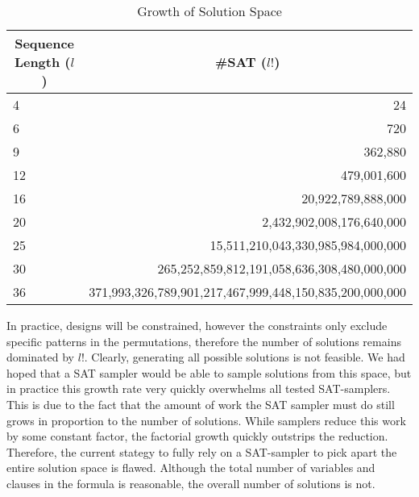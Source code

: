 \begin{table}[t]
  \centering
  \caption{Growth of Solution Space}
\begin{tabular}{|l|r|}
\hline
\multicolumn{1}{|c|}{\textbf{Sequence Length ($l$)}} & \multicolumn{1}{c|}{\textbf{\#SAT ($l!$)}}              \\ \hline
4                                                    & 24                                                      \\ \hline
6                                                    & 720                                                     \\ \hline
9                                                    & 362,880                                                 \\ \hline
12                                                   & 479,001,600                                             \\ \hline
16                                                   & 20,922,789,888,000                                      \\ \hline
20                                                   & 2,432,902,008,176,640,000                               \\ \hline
25                                                   & 15,511,210,043,330,985,984,000,000                      \\ \hline
30                                                   & 265,252,859,812,191,058,636,308,480,000,000             \\ \hline
36                                                   & 371,993,326,789,901,217,467,999,448,150,835,200,000,000 \\ \hline
\end{tabular}
\label{tab:factorial_explosion}
\end{table}

In practice, designs will be constrained, however the constraints only exclude specific patterns in the permutations, therefore the number of solutions remains dominated by $l!$. Clearly, generating all possible solutions is not feasible. We had hoped that a SAT sampler would be able to sample solutions from this space, but in practice this growth rate very quickly overwhelms all tested SAT-samplers. This is due to the fact that the amount of work the SAT sampler must do still grows in proportion to the number of solutions. While samplers reduce this work by some constant factor, the factorial growth quickly outstrips the reduction. Therefore, the current stategy to fully rely on a SAT-sampler to pick apart the entire solution space is flawed. Although the total number of variables and clauses in the formula is reasonable, the overall number of solutions is not.
